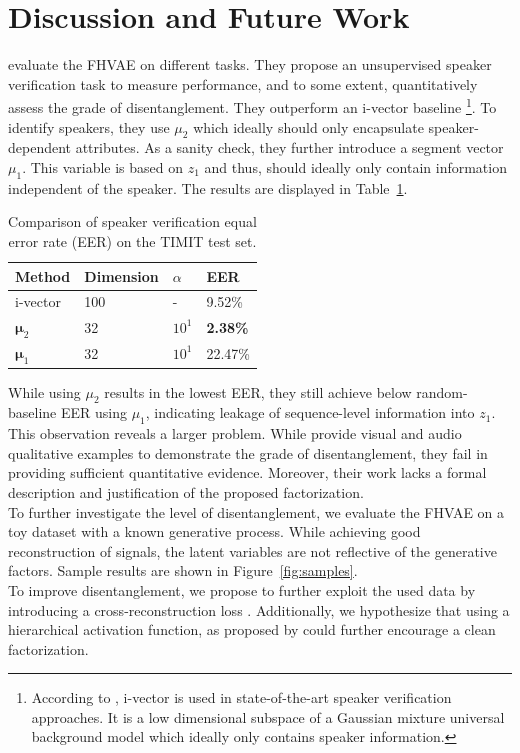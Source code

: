 \documentclass{article} %
\begin{document}
\section*{Discussion and Future Work}
\citet{hsu2017unsupervised} evaluate the FHVAE on different tasks. They propose an unsupervised speaker verification task to measure performance, and to some extent, quantitatively assess the grade of disentanglement. They outperform an i-vector baseline \footnote{According to \citet{hsu2017unsupervised}, i-vector is used in state-of-the-art speaker verification approaches. It is a low dimensional subspace of a Gaussian mixture universal background model which ideally only contains speaker information.}. To identify speakers, they use $\mu_2$ which ideally should only encapsulate speaker-dependent attributes. As a sanity check, they further introduce a segment vector $\mu_1$. This variable is based on $z_1$ and thus, should ideally only contain information independent of the speaker. The results are displayed in Table~\ref{tab:eer}.
\begin{table}[t]
	\caption{Comparison of speaker verification equal error rate (EER) on the TIMIT test set.}
	\centering
	\begin{tabular}{llll}
		\toprule
		Method 				& Dimension 	& $\alpha$ 		& EER  				 \\
		\midrule\midrule
		\multirow{1}{*}{i-vector}
		& 100   & -     & 9.52\%    \\
		\midrule
		\multirow{1}{*}{$\bm{\mu}_2$}  	& 32			& $10^1$	& \textbf{2.38\%}  	 	\\
		\midrule
		\multirow{1}{*}{$\bm{\mu}_1$}
	& 32			& $10^1$		& 22.47\%   	\\
		\bottomrule
	\end{tabular}
	\label{tab:eer}
\end{table}
While using $\mu_2$ results in the lowest EER, they still achieve below random-baseline EER using $\mu_1$, indicating leakage of sequence-level information into $z_1$. This observation reveals a larger problem. While \citet{hsu2017unsupervised} provide visual and audio qualitative examples to demonstrate the grade of disentanglement, they fail in providing sufficient quantitative evidence. Moreover, their work lacks a formal description and justification of the proposed factorization.\\
To further investigate the level of disentanglement, we evaluate the FHVAE on a toy dataset with a known generative process. While achieving good reconstruction of signals, the latent variables are not reflective of the generative factors. Sample results are shown in Figure~\ref{fig:samples}.\\
To improve disentanglement, we propose to further exploit the used data by introducing a cross-reconstruction loss \cite{schonfeld2019generalized}. Additionally, we hypothesize that using a hierarchical activation function, as proposed by \citet{shen2018ordered} could further encourage a clean factorization.
\end{document}
